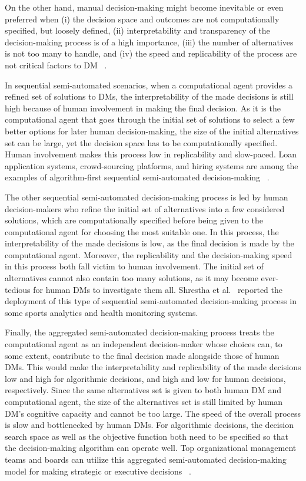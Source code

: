\documentclass{sfuthesis}
\begin{document}
On the other hand, manual decision-making might become inevitable or even preferred when (i) the decision space and outcomes are not computationally specified, but loosely defined, (ii) interpretability and transparency of the decision-making process is of a high importance, (iii) the number of alternatives is not too many to handle, and (iv) the speed and replicability of the process are not critical factors to DM ~\cite{shrestha_organizational_2019}.\par
In sequential semi-automated scenarios, when a computational agent provides a refined set of solutions to DMs, the interpretability of the made decisions is still high because of human involvement in making the final decision. As it is the computational agent that goes through the initial set of solutions to select a few better options for later human decision-making, the size of the initial alternatives set can be large, yet the decision space has to be computationally specified. Human involvement makes this process low in replicability and slow-paced. Loan application systems, crowd-sourcing platforms, and hiring systems are among the examples of algorithm-first sequential semi-automated decision-making ~\cite{shrestha_organizational_2019}.\par
The other sequential semi-automated decision-making process is led by human decision-makers who refine the initial set of alternatives into a few considered solutions, which are computationally specified before being given to the computational agent for choosing the most suitable one. In this process, the interpretability of the made decisions is low, as the final decision is made by the computational agent. Moreover, the replicability and the decision-making speed in this process both fall victim to human involvement. The initial set of alternatives cannot also contain too many solutions, as it may become ever-tedious for human DMs to investigate them all. Shrestha et al.~\cite{shrestha_organizational_2019} reported the deployment of this type of sequential semi-automated decision-making process in some sports analytics and health monitoring systems.\par
Finally, the aggregated semi-automated decision-making process treats the computational agent as an independent decision-maker whose choices can, to some extent, contribute to the final decision made alongside those of human DMs. This would make the interpretability and replicability of the made decisions low and high for algorithmic decisions, and high and low for human decisions, respectively. Since the same alternatives set is given to both human DM and computational agent, the size of the alternatives set is still limited by human DM’s cognitive capacity and cannot be too large. The speed of the overall process is slow and bottlenecked by human DMs. For algorithmic decisions, the decision search space as well as the objective function both need to be specified so that the decision-making algorithm can operate well. Top organizational management teams and boards can utilize this aggregated semi-automated decision-making model for making strategic or executive decisions ~\cite{shrestha_organizational_2019}.\par
\end{document}
